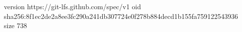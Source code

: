 version https://git-lfs.github.com/spec/v1
oid sha256:8f1ec2de2a8ee3fc290a241db307724e0f278b884decd1b155fa759122543936
size 738
